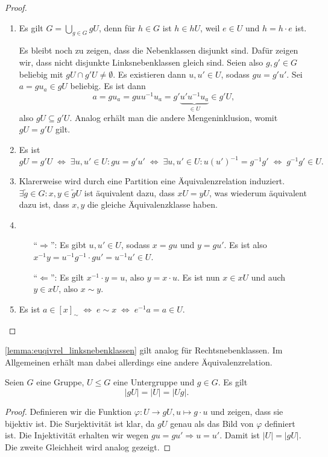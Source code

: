 \begin{proof}{\ }
    \begin{enumerate}
        \item Es gilt $G = \bigcup_{g \in G} gU$, denn für $h \in G$ ist $h \in hU$, weil $e \in U$ und $h = h \cdot e$ ist. 
        
        Es bleibt noch zu zeigen, dass die Nebenklassen disjunkt sind. Dafür zeigen wir, dass nicht disjunkte Linksnebenklassen gleich sind. Seien also $g, g' \in G$ beliebig mit $gU \cap g'U \not= \emptyset$. Es existieren dann $u, u' \in U$, sodass $g u = g' u'$. Sei $a = g  u_a \in gU$ beliebig. Es ist dann $$ a = g u_a = g u u^{-1} u_a = g' \underbrace{u' u^{-1} u_a}_{\in U} \in g'U, $$
        also $gU \subseteq g'U$. Analog erhält man die andere Mengeninklusion, womit $gU = g'U$ gilt.
        \item Es ist 
        $$gU = g'U \;\Leftrightarrow\; \exists u, u' \in U: gu = g'u' \;\Leftrightarrow\; \exists u, u' \in U: u\left(u'\right)^{-1} = g^{-1}g' \;\Leftrightarrow\; g^{-1}g' \in U.$$
        \item Klarerweise wird durch eine Partition eine Äquivalenzrelation induziert. $\exists \tilde{g} \in G: x,y \in \tilde{g}U$ ist äquivalent dazu, dass $xU = yU$, was wiederum äquivalent dazu ist, dass $x, y$ die gleiche Äquivalenzklasse haben.
        \item \begin{itemize}[leftmargin=1cm]
            \item[``$\Rightarrow$'':] Es gibt $u, u' \in U$, sodass $x = g u$ und $y = g u'$. Es ist also $x^{-1} y = u^{-1} g^{-1} \cdot g  u' = u^{-1} u' \in U$.
            \item[``$\Leftarrow$'':] Es gilt $x^{-1}\cdot y = u$, also $y = x\cdot u$.  Es ist nun $x \in xU$ und auch  $y \in xU$, also $x \sim y$. 
        \end{itemize}
        \item Es ist $a \in [x]_\sim \;\Leftrightarrow\; e \sim x \;\Leftrightarrow\; e^{-1} a = a \in U $.
    \end{enumerate}
\end{proof}

\begin{remark}
    \cref{lemma:euqivrel_linksnebenklassen} gilt analog für Rechtsnebenklassen. Im Allgemeinen erhält man dabei allerdings eine andere Äquivalenzrelation.
\end{remark}

\begin{lemma}
    Seien $G$ eine Gruppe, $U \le G$ eine Untergruppe und $g \in G$. Es gilt $$\vert gU \vert = \vert U \vert = \vert Ug \vert.$$
\end{lemma}
\begin{proof}
    Definieren wir die Funktion $\varphi: U \to gU, u \mapsto g\cdot u$ und zeigen, dass sie bijektiv ist. Die Surjektivität ist klar, da $gU$ genau als das Bild von $\varphi$ definiert ist. Die Injektivität erhalten wir wegen $gu = gu' \Rightarrow u = u'$. Damit ist $\vert U \vert = \vert gU \vert$. Die zweite Gleichheit wird analog gezeigt.
\end{proof}

